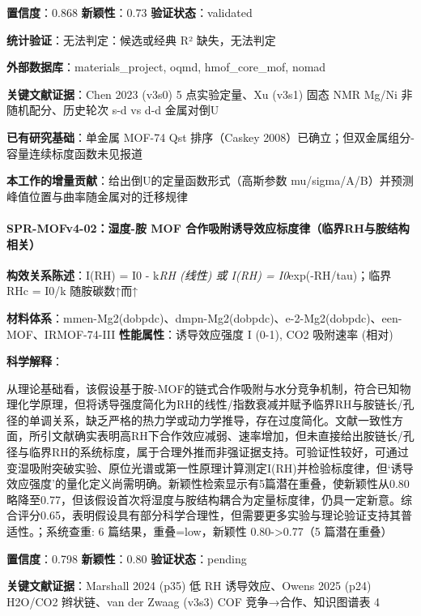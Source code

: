 \documentclass[12pt,a4paper]{ctexart}
\begin{document}
\textbf{置信度}：0.868 \textbar{} \textbf{新颖性}：0.73 \textbar{} \textbf{验证状态}：validated

\textbf{统计验证}：无法判定：候选或经典 R² 缺失，无法判定

\textbf{外部数据库}：materials\_project, oqmd, hmof\_core\_mof, nomad

\textbf{关键文献证据}：Chen 2023 (v3s0) 5 点实验定量、Xu (v3s1) 固态 NMR Mg/Ni 非随机配分、历史轮次 s-d vs d-d 金属对倒U

\textbf{已有研究基础}：单金属 MOF-74 Qst 排序（Caskey 2008）已确立；但双金属组分-容量连续标度函数未见报道

\textbf{本工作的增量贡献}：给出倒U的定量函数形式（高斯参数 mu/sigma/A/B）并预测峰值位置与曲率随金属对的迁移规律

\paragraph{SPR-MOFv4-02：湿度-胺 MOF 合作吸附诱导效应标度律（临界RH与胺结构相关）}\label{spr-mofv4-02ux6e7fux5ea6-ux80fa-mof-ux5408ux4f5cux5438ux9644ux8bf1ux5bfcux6548ux5e94ux6807ux5ea6ux5f8bux4e34ux754crhux4e0eux80faux7ed3ux6784ux76f8ux5173}

\textbf{构效关系陈述}：I(RH) = I0 - k\emph{RH (线性) 或 I(RH) = I0}exp(-RH/tau)；临界 RHc = I0/k 随胺碳数↑而↑

\textbf{材料体系}：mmen-Mg2(dobpdc)、dmpn-Mg2(dobpdc)、e-2-Mg2(dobpdc)、een-MOF、IRMOF-74-III \textbar{} \textbf{性能属性}：诱导效应强度 I (0-1), CO2 吸附速率 (相对)

\textbf{科学解释}：

从理论基础看，该假设基于胺-MOF的链式合作吸附与水分竞争机制，符合已知物理化学原理，但将诱导强度简化为RH的线性/指数衰减并赋予临界RH与胺链长/孔径的单调关系，缺乏严格的热力学或动力学推导，存在过度简化。文献一致性方面，所引文献确实表明高RH下合作效应减弱、速率增加，但未直接给出胺链长/孔径与临界RH的系统标度，属于合理外推而非强证据支持。可验证性较好，可通过变湿吸附突破实验、原位光谱或第一性原理计算测定I(RH)并检验标度律，但`诱导效应强度'的量化定义尚需明确。新颖性检索显示有5篇潜在重叠，使新颖性从0.80略降至0.77，但该假设首次将湿度与胺结构耦合为定量标度律，仍具一定新意。综合评分0.65，表明假设具有部分科学合理性，但需要更多实验与理论验证支持其普适性。；系统查重: 6 篇结果，重叠=low，新颖性 0.80-\textgreater0.77（5 篇潜在重叠）

\textbf{置信度}：0.798 \textbar{} \textbf{新颖性}：0.80 \textbar{} \textbf{验证状态}：pending

\textbf{关键文献证据}：Marshall 2024 (p35) 低 RH 诱导效应、Owens 2025 (p24) H2O/CO2 辫状链、van der Zwaag (v3s3) COF 竞争→合作、知识图谱表 4
\end{document}
